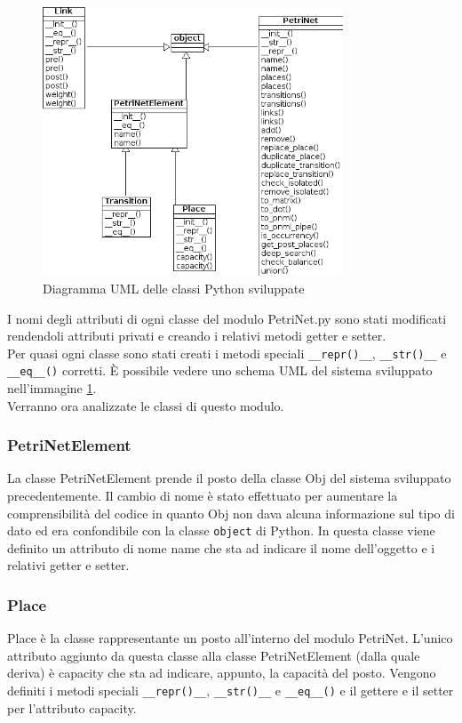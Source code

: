 \documentclass[italian,12pt]{book}
\begin{document}
\begin{figure}[htb]
\centerline{\includegraphics[height=8cm]{img/uml_pyth.png}}
\caption{Diagramma UML delle classi Python sviluppate}\label{fig:uml_pyth.png}
\end{figure}

I nomi degli attributi di ogni classe del modulo PetriNet.py sono stati modificati rendendoli attributi privati
e creando i relativi metodi getter e setter. \\
Per quasi ogni classe sono stati creati i metodi speciali {\tt \_\_repr()\_\_}, {\tt \_\_str()\_\_} e 
{\tt \_\_eq\_\_()} corretti. È possibile vedere uno schema UML del sistema sviluppato nell'immagine \ref{fig:uml_pyth.png}.\\
Verranno ora analizzate le classi di questo modulo.

\subsubsection{PetriNetElement}
La classe PetriNetElement prende il posto della classe Obj del sistema sviluppato precedentemente. Il cambio
di nome è stato effettuato per aumentare la comprensibilità del codice in quanto Obj non dava alcuna informazione
sul tipo di dato ed era confondibile con la classe {\tt object} di Python.
In questa classe viene definito un attributo di nome name che sta ad indicare il nome dell'oggetto e i relativi
getter e setter.

\subsubsection{Place}
Place è la classe rappresentante un posto all'interno del modulo PetriNet. L'unico attributo aggiunto da questa classe alla classe PetriNetElement (dalla quale deriva) è capacity che sta ad indicare, appunto, la capacità del posto. Vengono definiti i metodi speciali {\tt \_\_repr()\_\_}, {\tt \_\_str()\_\_} e {\tt \_\_eq\_\_()} e il gettere e il setter per l'attributo capacity.
\end{document}
